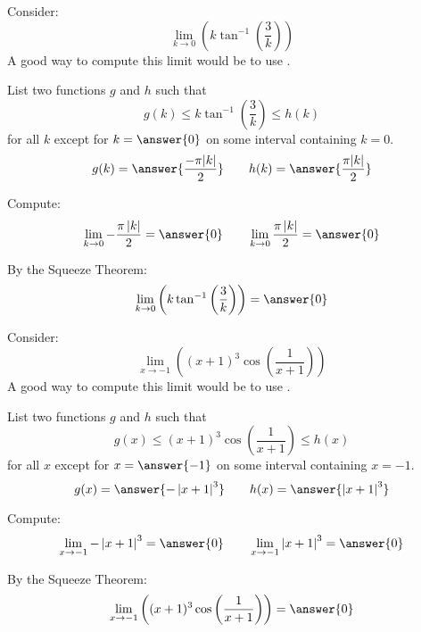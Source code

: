 \documentclass{ximera}
\begin{document}
\begin{exercise}


Consider:
\[
\lim_{k\to 0} \left(k \tan ^{-1}\left(\frac{3}{k}\right)\right)
\]
A good way to compute this limit would be to use .
\begin{exercise}
List two functions $g$ and $h$ such that
\[
g(k)\le k \tan ^{-1}\left(\frac{3}{k}\right) \le h(k)
\]
for all $k$ except for $k=\answer{0}$ on some interval containing $k=0$.
\[
g(k)=\answer{\frac{-\pi| k| }{2}}\qquad h(k) =\answer{\frac{\pi|k| }{2}}
\]
\begin{exercise}
Compute:
\[
\lim_{k \to 0}-\frac{\pi  \left| k\right| }{2} = \answer{0}\qquad \lim_{k\to 0}\frac{\pi  \left| k\right| }{2} = \answer{0}
\]
\begin{exercise}
By the Squeeze Theorem:
\[
\lim_{k\to 0} \left(k \tan ^{-1}\left(\frac{3}{k}\right)\right) = \answer{0}
\]
\end{exercise}
\end{exercise}
\end{exercise}
\end{exercise}



\begin{exercise}


Consider:
\[
\lim_{x\to -1} \left((x+1)^3 \cos \left(\frac{1}{x+1}\right)\right)
\]
A good way to compute this limit would be to use .
\begin{exercise}
List two functions $g$ and $h$ such that
\[
g(x)\le (x+1)^3 \cos \left(\frac{1}{x+1}\right) \le h(x)
\]
for all $x$ except for $x=\answer{-1}$ on some interval containing $x=-1$.
\[
g(x)=\answer{-\left| x+1\right| ^3}\qquad h(x) =\answer{\left| x+1\right| ^3}
\]
\begin{exercise}
Compute:
\[
\lim_{x \to -1}-\left| x+1\right| ^3 = \answer{0}\qquad \lim_{x\to -1}\left| x+1\right| ^3 = \answer{0}
\]
\begin{exercise}
By the Squeeze Theorem:
\[
\lim_{x\to -1} \left((x+1)^3 \cos \left(\frac{1}{x+1}\right)\right) = \answer{0}
\]
\end{exercise}
\end{exercise}
\end{exercise}
\end{exercise}
\end{document}
